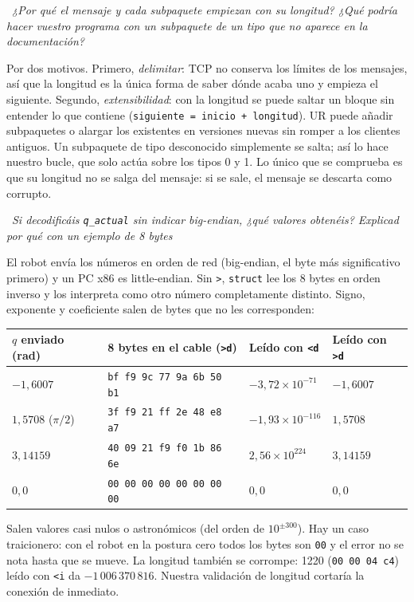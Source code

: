 \documentclass[10pt,a4paper]{article}
\newcommand{\code}[1]{\texttt{\small #1}}
\newcommand{\preg}[2]{\par\smallskip\noindent{\color{azul}\bfseries P#1.}~{\itshape #2}\par\nopagebreak}
\begin{document}
\preg{2}{¿Por qué el mensaje y cada subpaquete empiezan con su longitud? ¿Qué podría hacer
vuestro programa con un subpaquete de un tipo que no aparece en la documentación?}
Por dos motivos. Primero, \emph{delimitar}: TCP no conserva los límites de los mensajes, así que la longitud es la única forma de saber dónde acaba uno y empieza el siguiente. Segundo, \emph{extensibilidad}: con la longitud se puede saltar un bloque sin entender lo que contiene (\code{siguiente = inicio + longitud}). UR puede añadir subpaquetes o alargar los existentes en versiones nuevas sin romper a los clientes antiguos. Un subpaquete de tipo desconocido simplemente se salta; así lo hace nuestro bucle, que solo actúa sobre los tipos 0 y 1. Lo único que se comprueba es que su longitud no se salga del mensaje: si se sale, el mensaje se descarta como corrupto.

\preg{3}{Si decodificáis \code{q\_actual} sin indicar big-endian, ¿qué valores obtenéis? Explicad por qué con un ejemplo de 8 bytes}

El robot envía los números en orden de red (big-endian, el byte más significativo primero) y un PC x86 es little-endian. Sin \code{>}, \code{struct} lee los 8 bytes en orden inverso y los interpreta como otro número completamente distinto. Signo, exponente y coeficiente salen de bytes que no les corresponden:

\begin{center}\small
\begin{tabular}{@{}l l l l@{}}
\toprule
$q$ enviado (rad) & 8 bytes en el cable (\code{>d}) & Leído con \code{<d} & Leído con \code{>d}\\ \midrule
$-1{,}6007$  & \code{bf f9 9c 77 9a 6b 50 b1} & $-3{,}72\times10^{-71}$ & $-1{,}6007$ \\
$1{,}5708$ ($\pi/2$) & \code{3f f9 21 ff 2e 48 e8 a7} & $-1{,}93\times10^{-116}$ & $1{,}5708$ \\
$3{,}14159$ & \code{40 09 21 f9 f0 1b 86 6e} & $2{,}56\times10^{224}$ & $3{,}14159$ \\
$0{,}0$ & \code{00 00 00 00 00 00 00 00} & $0{,}0$ & $0{,}0$ \\ \bottomrule
\end{tabular}
\end{center}

Salen valores casi nulos o astronómicos (del orden de $10^{\pm300}$). Hay un caso traicionero: con el robot en la postura cero todos los bytes son \code{00} y el error no se nota hasta que se mueve. La longitud también se corrompe: 1220 (\code{00 00 04 c4}) leído con \code{<i} da $-1\,006\,370\,816$. Nuestra validación de longitud cortaría la conexión de inmediato.
\end{document}
